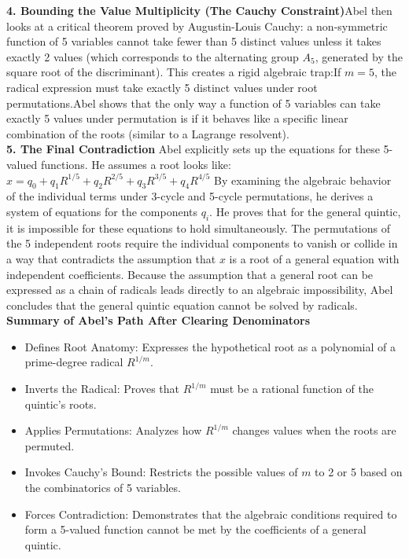  {\bf 4. Bounding the Value Multiplicity (The Cauchy Constraint)}Abel 
 then looks at a critical theorem proved by Augustin-Louis Cauchy: a non-symmetric function of 5 variables cannot take fewer than 5 distinct values unless it takes exactly 2 values (which corresponds to the alternating group \(A_{5}\), generated by the square root of the discriminant).
 This creates a rigid algebraic trap:If \(m = 5\), the radical expression must take exactly 5 distinct values under root permutations.Abel shows that the only way a function of 5 variables can take exactly 5 values under permutation is if it behaves like a specific linear combination of the roots (similar to a Lagrange resolvent).\\

 {\bf 5. The Final Contradiction}
 Abel explicitly sets up the equations for these 5-valued functions. He assumes a root looks like:\(x=q_{0}+q_{1}R^{1/5}+q_{2}R^{2/5}+q_{3}R^{3/5}+q_{4}R^{4/5}\)
 By examining the algebraic behavior of the individual terms under 3-cycle and 5-cycle permutations, he derives a system of equations for the components \(q_{i}\).
 He proves that for the general quintic, it is impossible for these equations to hold simultaneously. 
 The permutations of the 5 independent roots require the individual components to vanish or collide in a way that contradicts the assumption that \(x\) is a root of a general equation with independent coefficients.
 Because the assumption that a general root can be expressed as a chain of radicals leads directly to an algebraic impossibility, Abel concludes that the general quintic equation cannot be solved by radicals. \\

 {\bf Summary of Abel's Path After Clearing Denominators}
 \begin{itemize}
 \item[]Defines Root Anatomy: Expresses the hypothetical root as a polynomial of a prime-degree radical \(R^{1/m}\).
 \item[]Inverts the Radical: Proves that \(R^{1/m}\) must be a rational function of the quintic's roots.
 \item[]Applies Permutations: Analyzes how \(R^{1/m}\) changes values when the roots are permuted.
 \item[]Invokes Cauchy's Bound: Restricts the possible values of \(m\) to 2 or 5 based on the combinatorics of 5 variables.
 \item[]Forces Contradiction: Demonstrates that the algebraic conditions required to form a 5-valued function cannot be met by the coefficients of a general quintic.
 \end{itemize}
 
